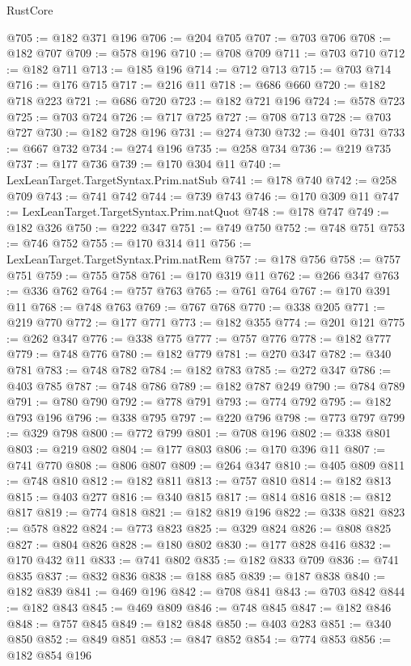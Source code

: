 \begin{lexlean}{RustCore}
\begin{coremodule}
@705 := @182 @371 @196
@706 := @204 @705
@707 := @703 @706
@708 := @182 @707
@709 := @578 @196
@710 := @708 @709
@711 := @703 @710
@712 := @182 @711
@713 := @185 @196
@714 := @712 @713
@715 := @703 @714
@716 := @176 @715
@717 := @216 @11
@718 := @686 @660
@720 := @182 @718 @223
@721 := @686 @720
@723 := @182 @721 @196
@724 := @578 @723
@725 := @703 @724
@726 := @717 @725
@727 := @708 @713
@728 := @703 @727
@730 := @182 @728 @196
@731 := @274 @730
@732 := @401 @731
@733 := @667 @732
@734 := @274 @196
@735 := @258 @734
@736 := @219 @735
@737 := @177 @736
@739 := @170 @304 @11
@740 := LexLeanTarget.TargetSyntax.Prim.natSub
@741 := @178 @740
@742 := @258 @709
@743 := @741 @742
@744 := @739 @743
@746 := @170 @309 @11
@747 := LexLeanTarget.TargetSyntax.Prim.natQuot
@748 := @178 @747
@749 := @182 @326
@750 := @222 @347
@751 := @749 @750
@752 := @748 @751
@753 := @746 @752
@755 := @170 @314 @11
@756 := LexLeanTarget.TargetSyntax.Prim.natRem
@757 := @178 @756
@758 := @757 @751
@759 := @755 @758
@761 := @170 @319 @11
@762 := @266 @347
@763 := @336 @762
@764 := @757 @763
@765 := @761 @764
@767 := @170 @391 @11
@768 := @748 @763
@769 := @767 @768
@770 := @338 @205
@771 := @219 @770
@772 := @177 @771
@773 := @182 @355
@774 := @201 @121
@775 := @262 @347
@776 := @338 @775
@777 := @757 @776
@778 := @182 @777
@779 := @748 @776
@780 := @182 @779
@781 := @270 @347
@782 := @340 @781
@783 := @748 @782
@784 := @182 @783
@785 := @272 @347
@786 := @403 @785
@787 := @748 @786
@789 := @182 @787 @249
@790 := @784 @789
@791 := @780 @790
@792 := @778 @791
@793 := @774 @792
@795 := @182 @793 @196
@796 := @338 @795
@797 := @220 @796
@798 := @773 @797
@799 := @329 @798
@800 := @772 @799
@801 := @708 @196
@802 := @338 @801
@803 := @219 @802
@804 := @177 @803
@806 := @170 @396 @11
@807 := @741 @770
@808 := @806 @807
@809 := @264 @347
@810 := @405 @809
@811 := @748 @810
@812 := @182 @811
@813 := @757 @810
@814 := @182 @813
@815 := @403 @277
@816 := @340 @815
@817 := @814 @816
@818 := @812 @817
@819 := @774 @818
@821 := @182 @819 @196
@822 := @338 @821
@823 := @578 @822
@824 := @773 @823
@825 := @329 @824
@826 := @808 @825
@827 := @804 @826
@828 := @180 @802
@830 := @177 @828 @416
@832 := @170 @432 @11
@833 := @741 @802
@835 := @182 @833 @709
@836 := @741 @835
@837 := @832 @836
@838 := @188 @85
@839 := @187 @838
@840 := @182 @839
@841 := @469 @196
@842 := @708 @841
@843 := @703 @842
@844 := @182 @843
@845 := @469 @809
@846 := @748 @845
@847 := @182 @846
@848 := @757 @845
@849 := @182 @848
@850 := @403 @283
@851 := @340 @850
@852 := @849 @851
@853 := @847 @852
@854 := @774 @853
@856 := @182 @854 @196

\end{coremodule}
\end{lexlean}
